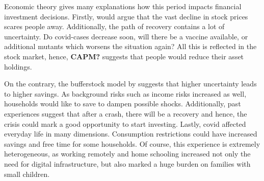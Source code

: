 \documentclass[ProjectABM]{subfiles}
\begin{document}


Economic theory gives many explanations how this period impacts financial investment decisions. Firstly, \cite{malmendier_2011} would argue that the vast decline in stock prices scares people away. Additionally, the path of recovery contains a lot of uncertainty. Do covid-cases decrease soon, will there be a vaccine available, or additional mutants which worsens the situation again? All this is reflected in the stock market, hence, \textbf{CAPM?} suggests that people would reduce their asset holdings.

On the contrary, the bufferstock model by \cite{carroll2009bufferstock} suggests that higher uncertainty leads to higher savings. As background risks such as income risks increased as well, households would like to save to dampen possible shocks. %
Additionally, past experiences suggest that after a crash, there will be a recovery and hence, the crisis could mark a good opportunity to start investing. Lastly, covid affected everyday life in many dimensions. Consumption restrictions could have increased savings and free time for some households. Of course, this experience is extremely heterogeneous, as working remotely and home schooling increased not only the need for digital infrastructure, but also marked a huge burden on families with small children.


\end{document}
